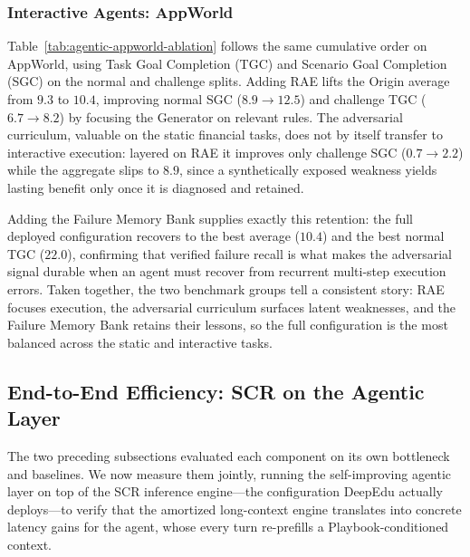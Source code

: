 \documentclass[10pt,conference]{IEEEtran}
\begin{document}
\subsubsection{Interactive Agents: AppWorld}

Table~\ref{tab:agentic-appworld-ablation} follows the same cumulative
order on AppWorld, using Task Goal Completion (TGC) and Scenario Goal
Completion (SGC) on the normal and challenge splits. Adding RAE lifts the
Origin average from $9.3$ to $10.4$, improving normal SGC ($8.9\to12.5$)
and challenge TGC ($6.7\to8.2$) by focusing the Generator on relevant
rules. The adversarial curriculum, valuable on the static financial
tasks, does not by itself transfer to interactive execution: layered on
RAE it improves only challenge SGC ($0.7\to2.2$) while the aggregate slips
to $8.9$, since a synthetically exposed weakness yields lasting benefit
only once it is diagnosed and retained.

Adding the Failure Memory Bank supplies exactly this retention: the full
deployed configuration recovers to the best average ($10.4$) and the best
normal TGC ($22.0$), confirming that verified failure recall is what makes
the adversarial signal durable when an agent must recover from recurrent
multi-step execution errors. Taken together, the two benchmark groups
tell a consistent story: RAE focuses execution, the adversarial curriculum
surfaces latent weaknesses, and the Failure Memory Bank retains their
lessons, so the full configuration is the most balanced across the static
and interactive tasks.

\subsection{End-to-End Efficiency: SCR on the Agentic Layer}
\label{subsec:exp-scr-agent}

The two preceding subsections evaluated each component on its own
bottleneck and baselines. We now measure them jointly, running the
self-improving agentic layer on top of the SCR inference engine---the
configuration DeepEdu actually deploys---to verify that the amortized
long-context engine translates into concrete latency gains for the
agent, whose every turn re-prefills a Playbook-conditioned context.
\end{document}
